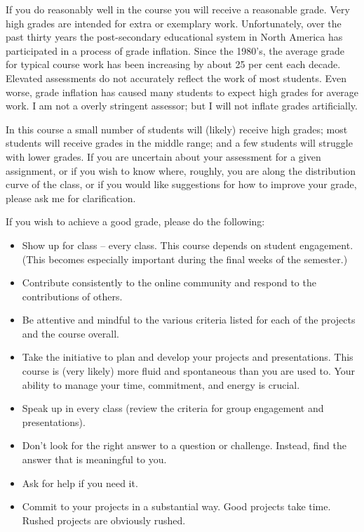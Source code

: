 \documentclass[letterpaper,10pt,headsepline]{scrreprt}
\begin{document}
If you do reasonably well in the course you will receive a reasonable grade. Very high grades are intended for extra or exemplary work. Unfortunately, over the past thirty years the post-secondary educational system in North America has participated in a process of grade inflation. Since the 1980's, the average grade for typical course work has been increasing by about 25 per cent each decade.
Elevated assessments do not accurately reflect the work of most students. Even worse, grade inflation has caused many students to expect high grades for average work. I am not a overly stringent assessor; but I will not inflate grades artificially.

In this course a small number of students will (likely) receive high grades; most students will receive grades in the middle range; and a few students will struggle with lower grades. If you are uncertain about your assessment for a given assignment, or if you wish to know where, roughly, you are along the distribution curve of the class, or if you would like suggestions for how to improve your grade, please ask me for clarification.

If you wish to achieve a good grade, please do the following:

\begin{itemize}
\item Show up for class -- every class. This course depends on student engagement. (This becomes especially important during the final weeks of the semester.)
\item Contribute consistently to the online community and respond to the contributions of others.
\item Be attentive and mindful to the various criteria listed for each of the projects and the course overall.
\item Take the initiative to plan and develop your projects and presentations. This course is (very likely) more fluid and spontaneous than you are used to. Your ability to manage your time, commitment, and energy is crucial.
\item Speak up in every class (review the criteria for group engagement and presentations).
\item Don't look for the right answer to a question or challenge. Instead, find the answer that is meaningful to you.
\item Ask for help if you need it.
\item Commit to your projects in a substantial way. Good projects take time. Rushed projects are obviously rushed.
\end{itemize}
\end{document}

